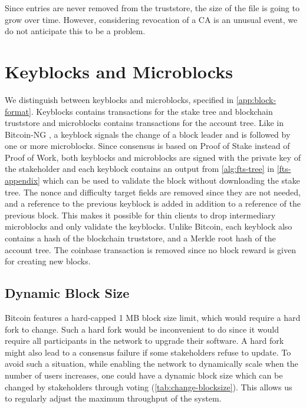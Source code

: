 \documentclass{style/kththesis}
\begin{document}
Since entries are never removed from the truststore, the size of the file is going to grow over time. However, considering revocation of a CA is an unusual event, we do not anticipate this to be a problem.

\section{Keyblocks and Microblocks}
We distinguish between keyblocks and microblocks, specified in \cref{app:block-format}. Keyblocks contains transactions for the stake tree and blockchain truststore and microblocks contains transactions for the account tree. Like in Bitcoin-NG \cite{Eyal15}, a keyblock signals the change of a block leader and is followed by one or more microblocks. Since consensus is based on Proof of Stake instead of Proof of Work, both keyblocks and microblocks are signed with the private key of the stakeholder and each keyblock contains an output from \cref{alg:fts-tree} in \cref{fts-appendix} which can be used to validate the block without downloading the stake tree. The nonce and difficulty target fields are removed since they are not needed, and a reference to the previous keyblock is added in addition to a reference of the previous block. This makes it possible for thin clients to drop intermediary microblocks and only validate the keyblocks. Unlike Bitcoin, each keyblock also contains a hash of the blockchain truststore, and a Merkle root hash of the account tree. The coinbase transaction is removed since no block reward is given for creating new blocks.

\subsection{Dynamic Block Size}
\label{dyn-block}
Bitcoin features a hard-capped 1 MB block size limit, which would require a hard fork to change. Such a hard fork would be inconvenient to do since it would require all participants in the network to upgrade their software. A hard fork might also lead to a consensus failure if some stakeholders refuse to update. To avoid such a situation, while enabling the network to dynamically scale when the number of users increases, one could have a dynamic block size which can be changed by stakeholders through voting (\cref{tab:change-blocksize}). This allows us to regularly adjust the maximum throughput of the system.
\end{document}
